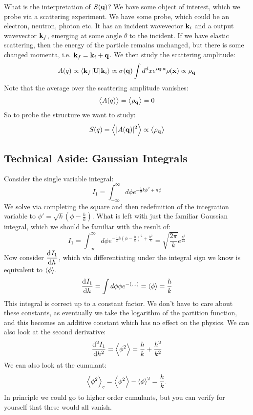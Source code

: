 What is the interpretation of $S(\mathbf{q})$? We have some object of interest, which we probe via a scattering experiment. We have some probe, which could be an electron, neutron, photon etc. It has an incident wavevector $\mathbf{k}_i$ and a output wavevector $\mathbf{k}_f$, emerging at some angle $\theta$ to the incident. If we have elastic scattering, then the energy of the particle remains unchanged, but there is some changed momenta, i.e. $\mathbf{k}_f = \mathbf{k}_i + \mathbf{q}$. We then study the scattering amplitude:
\begin{equation}
    A(q) \propto \langle \mathbf{k}_f \rvert\mathbf{U}\lvert \mathbf{k}_i \rangle \propto \sigma(\mathbf{q})\int d^dx e^{i\mathbf{q}\cdot \mathbf{x}}\rho(\mathbf{x}) \propto \rho_{\mathbf{q}}
\end{equation}
Note that the average over the scattering amplitude vanishes:
\begin{equation}
    \left< A(q) \right> = \left< \rho_{\mathbf{q}} \right> = 0
\end{equation}
So to probe the structure we want to study:
\begin{equation}
    S(q) = \left< \lvert A(\mathbf{q}) \rvert^2 \right> \propto \left< \rho_{\mathbf{q}} \right>
\end{equation}

\subsection{Technical Aside: Gaussian Integrals}
Consider the single variable integral:
\begin{equation}
    I_1 = \int_{-\infty}^\infty d\phi e^{-\frac{1}{2}k\phi^2 + n\phi}
\end{equation}
We solve via completing the square and then redefinition of the integration variable to $\phi' = \sqrt{k}(\phi - \frac{h}{k})$. What is left with just the familiar Gaussian integral, which we should be familiar with the result of:
\begin{equation}
    I_1 = \int_{-\infty}^\infty d\phi e^{-\frac{1}{2}k(\phi - \frac{h}{k})^2 + \frac{h^2}{k}} = \sqrt{\frac{2\pi}{k}}e^{\frac{h^2}{2k}}
\end{equation}
Now consider $\dod{I_1}{h}$, which via differentiating under the integral sign we know is equivalent to $\left< \phi \right>$.
\begin{equation}
    \dod{I_1}{h} = \int d\phi \phi e^{-(\ldots)} = \avg{\phi} = \frac{h}{k}
\end{equation}
This integral is correct up to a constant factor. We don't have to care about these constants, as eventually we take the logarithm of the partition function, and this becomes an additive constant which has no effect on the physics. We can also look at the second derivative:
\begin{equation}
    \dod[2]{I_1}{h} = \avg{\phi^2} = \frac{h}{k} + \frac{h^2}{k^2}
\end{equation}
We can also look at the cumulant:
\begin{equation}
    \left< \phi^2 \right>_c = \left< \phi^2 \right> - \left< \phi \right>^2 = \frac{h}{k}.
\end{equation}
In principle we could go to higher order cumulants, but you can verify for yourself that these would all vanish.

